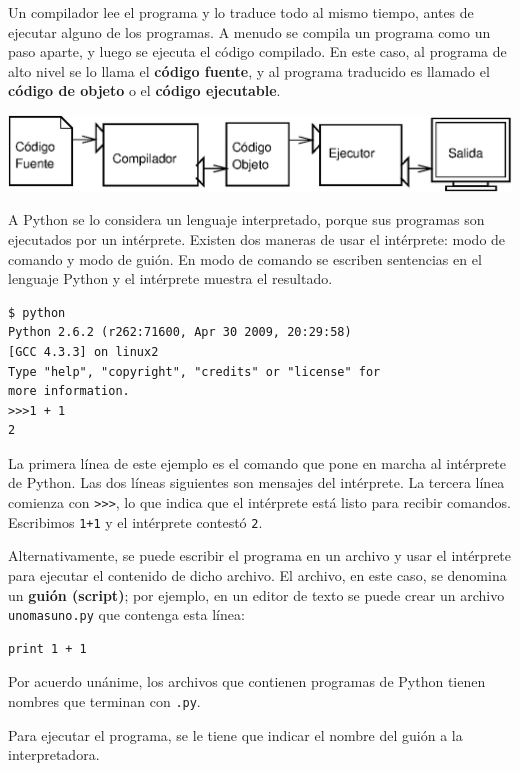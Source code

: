Un compilador lee el programa y lo traduce todo al mismo tiempo,
antes de ejecutar alguno de los programas. A menudo se compila un
programa como un paso aparte, y luego se ejecuta el código
compilado. En este caso, al programa de alto nivel se lo llama el
{\bf código fuente}, y al programa traducido es llamado el {\bf
código de objeto} o el {\bf código ejecutable}.

\vspace{0.1in}
\centerline{\includegraphics[scale=0.7]{illustrations/compile.eps}}
\vspace{0.1in}

A Python se lo considera un lenguaje interpretado, porque sus programas
son ejecutados por un intérprete. Existen dos maneras
de usar el intérprete: modo de comando y modo de guión. En modo
de comando se escriben sentencias en el lenguaje Python y
el intérprete muestra el resultado.

\begin{verbatim}
$ python
Python 2.6.2 (r262:71600, Apr 30 2009, 20:29:58) 
[GCC 4.3.3] on linux2
Type "help", "copyright", "credits" or "license" for 
more information.
>>>1 + 1
2
\end{verbatim}

La primera línea de este ejemplo es el comando que pone en marcha
al intérprete de Python. Las dos líneas siguientes son mensajes
del intérprete. La tercera línea comienza con {\verb+>>>+}, lo que
indica que el intérprete está listo para recibir comandos.
Escribimos \texttt{1+1} y el intérprete contestó \texttt{2}.

Alternativamente, se puede escribir el programa en un archivo y
usar el intérprete para ejecutar el contenido de dicho
archivo. El archivo, en este caso, se denomina un {\bf guión (script)};
por ejemplo, en un editor de texto se puede crear un archivo 
\texttt{unomasuno.py} que contenga esta línea:

\begin{verbatim}
print 1 + 1
\end{verbatim}

Por acuerdo unánime, los archivos que contienen programas de Python 
tienen nombres que terminan con \texttt{.py}.

Para ejecutar el programa, se le tiene que indicar el nombre del
guión a la interpretadora.

